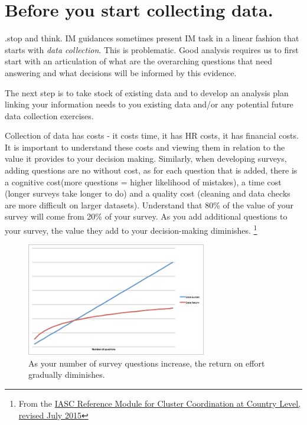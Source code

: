\documentclass[
  a4paper,
  onecolumn,
  oneside]{book}
\begin{document}
\hypertarget{before-you-start-collecting-data.}{%
\section{Before you start collecting
data.}\label{before-you-start-collecting-data.}}

.stop and think. IM guidances sometimes present IM task in a linear
fashion that starts with \emph{data collection}. This is problematic.
Good analysis requires us to first start with an articulation of what
are the overarching questions that need answering and what decisions
will be informed by this evidence.

The next step is to take stock of existing data and to develop an
analysis plan linking your information needs to you existing data and/or
any potential future data collection exercises.

Collection of data has costs - it costs time, it has HR costs, it has
financial costs. It is important to understand these costs and viewing
them in relation to the value it provides to your decision making.
Similarly, when developing surveys, adding questions are no without
cost, as for each question that is added, there is a cognitive cost(more
questions = higher likelihood of mistakes), a time cost (longer surveys
take longer to do) and a quality cost (cleaning and data checks are more
difficult on larger datasets). Understand that 80\% of the value of your
survey will come from 20\% of your survey. As you add additional
questions to your survey, the value they add to your decision-making
diminishes. \footnote{From the
  \href{files/Reference\%20Module\%20for\%20Cluster\%20Coordination\%20at\%20Country\%20Level.pdf}{IASC
  Reference Module for Cluster Coordination at Country Level, revised
  July 2015}}

\begin{figure}

{\centering \includegraphics[width=0.7\textwidth,height=\textheight]{part1/./images/minimalviableinformation.png}

}

\caption{As your number of survey questions increase, the return on
effort gradually diminishes.}

\end{figure}
\end{document}
